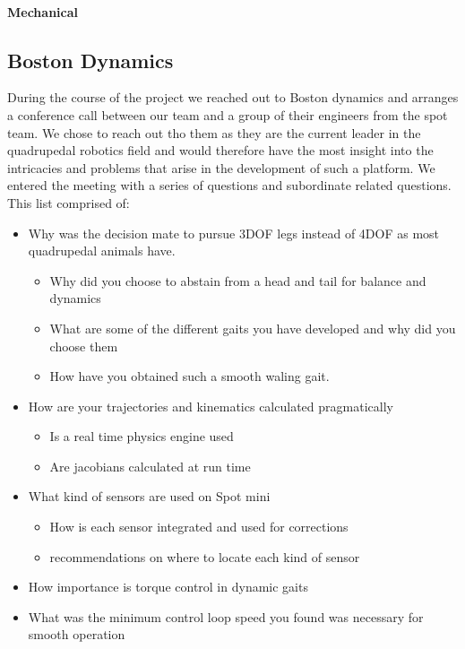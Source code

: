     \paragraph{Mechanical}

\subsection{Boston Dynamics}
    During the course of the project we reached out to Boston dynamics and arranges a conference call between our team and a group of their engineers from the spot team. We chose to reach out tho them as they are the current leader in the quadrupedal robotics field and would therefore have the most insight into the intricacies and problems that arise in the development of such a platform. We entered the meeting with a series of questions and subordinate related questions. This list comprised of:
    \begin{itemize}
        \item Why was the decision mate to pursue 3DOF legs instead of 4DOF as most quadrupedal animals have. 
        \begin{itemize}
            \item Why did you choose to abstain from a head and tail for balance and dynamics
            \item What are some of the different gaits you have developed and why did you choose them
            \item How have you obtained such a smooth waling gait.
        \end{itemize}
        \item How are your trajectories and kinematics calculated pragmatically
            \begin{itemize}
                \item Is a real time physics engine used
                \item Are jacobians calculated at run time
            \end{itemize}
        \item What kind of sensors are used on Spot mini
            \begin{itemize}
                \item How is each sensor integrated and used for corrections
                \item recommendations on where to locate each kind of sensor
            \end{itemize}
        \item How importance is torque control in dynamic gaits
        \item What was the minimum control loop speed you found was necessary for smooth operation
    \end{itemize}

